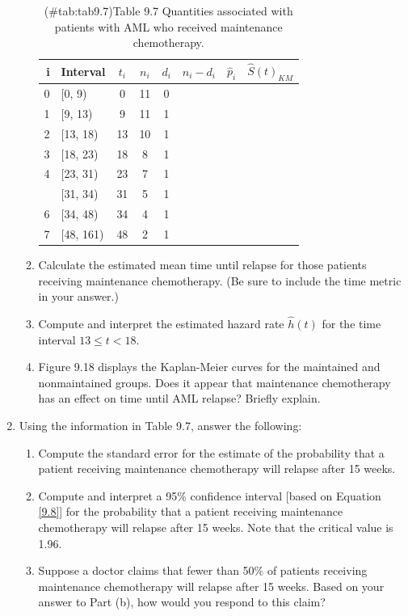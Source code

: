 \documentclass[
]{book}
\begin{document}
\begin{enumerate}
\begin{enumerate}
\begin{table}[!h]
\centering
\caption{(\#tab:tab9.7)Table 9.7 Quantities associated with patients with AML who received maintenance chemotherapy.}
\centering
\begin{tabular}[t]{rlcccccc}
\toprule
i & Interval & $t_i$ & $n_i$ & $d_i$ & $n_i - d_i$ & $\hat{p}_i$ & $\hat{S}(t)_{KM}$\\
\midrule
0 & {}[0, 9) & 0 & 11 & 0 &  &  & \\
1 & {}[9, 13) & 9 & 11 & 1 &  &  & \\
2 & {}[13, 18) & 13 & 10 & 1 &  &  & \\
3 & {}[18, 23) & 18 & 8 & 1 &  &  & \\
4 & {}[23, 31) & 23 & 7 & 1 &  &  & \\
\addlinespace
5 & {}[31, 34) & 31 & 5 & 1 &  &  & \\
6 & {}[34, 48) & 34 & 4 & 1 &  &  & \\
7 & {}[48, 161) & 48 & 2 & 1 &  &  & \\
\bottomrule
\end{tabular}
\end{table}
    \item Calculate the estimated mean time until relapse for those patients receiving maintenance chemotherapy. (Be sure to include the time metric in your answer.)
    \item Compute and interpret the estimated hazard rate $\hat{h}(t)$ for the time interval $13 \leq t < 18$.
    \item Figure 9.18 displays the Kaplan-Meier curves for the maintained and nonmaintained groups. Does it appear that maintenance chemotherapy has an effect on time until AML relapse? Briefly explain.
  \end{enumerate}

  \item Using the information in Table 9.7, answer the following:
  \begin{enumerate}
    \item Compute the standard error for the estimate of the probability that a patient receiving maintenance chemotherapy will relapse after 15 weeks.
    \item Compute and interpret a 95\% confidence interval [based on Equation \ref{9.8}] for the probability that a patient receiving maintenance chemotherapy will relapse after 15 weeks. Note that the critical value is 1.96.
    \item Suppose a doctor claims that fewer than 50\% of patients receiving maintenance chemotherapy will relapse after 15 weeks. Based on your answer to Part (b), how would you respond to this claim?
  \end{enumerate}


\end{enumerate}
\end{document}
